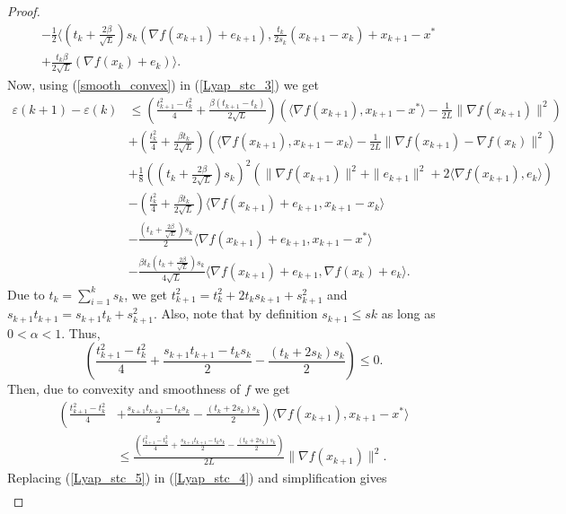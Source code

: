 \documentclass{article}
\theoremstyle{plain}
\theoremstyle{definition}
\theoremstyle{remark}
\begin{document}
\begin{proof}
\begin{align}
        &-\frac{1}{2}\langle (t_k+\frac{2\beta}{\sqrt{L}})s_k (\nabla f(x_{k+1})+e_{k+1}), \frac{t_k}{2s_k}(x_{k+1}-x_k)+x_{k+1}-x^*\nonumber\\
        &+\frac{t_k\beta}{2\sqrt{L}}(\nabla f(x_k)+e_k)\rangle.
    \end{align}
    Now, using (\ref{smooth_convex}) in (\ref{Lyap_stc_3}) we get
    \begin{align}\label{Lyap2_stc_4}
         \varepsilon(k+1)-\varepsilon(k)&\leq (\frac{t_{k+1}^2-t_k^2}{4}+\frac{\beta(t_{k+1}-t_k)}{2\sqrt{L}})(\langle \nabla f(x_{k+1}),x_{k+1}-x^* \rangle-\frac{1}{2L}\|\nabla f(x_{k+1})\|^2)\nonumber\\
         & +(\frac{t_{k}^2}{4}+\frac{\beta t_{k}}{2\sqrt{L}})(\langle \nabla f(x_{k+1}),x_{k+1}-x_k \rangle-\frac{1}{2L}\|\nabla f(x_{k+1})-\nabla f(x_k)\|^2)\nonumber\\
         & +\frac{1}{8}((t_k+\frac{2\beta}{2\sqrt{L}})s_k)^2(\|\nabla f(x_{k+1})\|^2+\|e_{k+1}\|^2+2\langle \nabla f(x_{k+1}) ,e_k \rangle) \nonumber\\
         & -(\frac{t_k^2}{4}+\frac{\beta t_k}{2\sqrt{L}})\langle \nabla f(x_{k+1})+e_{k+1},x_{k+1}-x_k\rangle\nonumber\\
         &-\frac{(t_k+\tfrac{2\beta}{\sqrt{L}})s_k}{2}\langle \nabla f(x_{k+1})+e_{k+1},x_{k+1}-x^*\rangle\nonumber\\
         & -\frac{\beta t_k(t_k+\frac{2\beta}{\sqrt{L}})s_k}{4\sqrt{L}}\langle \nabla f(x_{k+1})+e_{k+1}, \nabla f(x_k)+e_k \rangle.
         \end{align}
          Due to $t_k=\sum_{i=1}^k s_k$, we get $t_{k+1}^2=t_k^2 + 2t_ks_{k+1}+ s_{k+1}^2$ and $s_{k+1}t_{k+1}=s_{k+1}t_k+s_{k+1}^2$. Also, note  that by definition $s_{k+1}\leq s{k}$ as long as $0<\alpha<1$. Thus,
         $$\left(\frac{t_{k+1}^2-t_k^2}{4}+\frac{s_{k+1}t_{k+1}-t_ks_k}{2} -\frac{(t_k+2s_k)s_k}{2}\right)\leq 0.$$
         Then, due to convexity and smoothness of $f$ we get
         \begin{align}\label{Lyap_stc_5}
             \left(\frac{t_{k+1}^2-t_k^2}{4}\right.&\left.+\frac{s_{k+1}t_{k+1}-t_ks_k}{2} -\frac{(t_k+2s_k)s_k}{2}\right)\langle \nabla f(x_{k+1}), x_{k+1}-x^* \rangle\nonumber\\
             &\leq \frac{\left(\frac{t_{k+1}^2-t_k^2}{4}+\frac{s_{k+1}t_{k+1}-t_ks_k}{2} -\frac{(t_k+2s_k)s_k}{2}\right)}{2L}\|\nabla f(x_{k+1})\|^2.
         \end{align} 
        Replacing (\ref{Lyap_stc_5}) in (\ref{Lyap_stc_4}) and simplification gives
        \begin{align}\label{Lyap_stc_6}

\end{align}
\end{proof}
\end{document}
